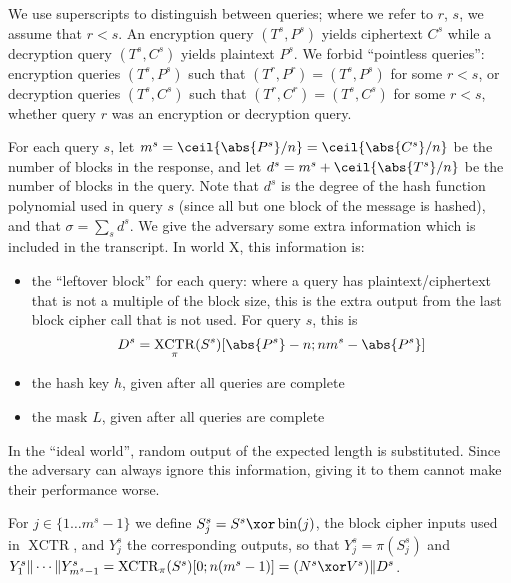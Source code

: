 \documentclass[letterpaper,11pt]{article}
\newcommand*{\Concat}{\Vert}
\DeclareMathOperator{\fromint}{bin}
\DeclareMathOperator{\XCTR}{XCTR}
\begin{document}
We use superscripts to distinguish between queries;
where we refer to \(r\), \(s\), we assume that \(r < s\).
An encryption query \((T^s, P^s)\) yields ciphertext \(C^s\)
while a decryption query \((T^s, C^s)\)
yields plaintext \(P^s\).
We forbid ``pointless queries'':
encryption queries \((T^s, P^s)\)
such that \((T^r, P^r) = (T^s, P^s)\) for some \(r < s\), 
or decryption queries \((T^s, C^s)\)
such that \((T^r, C^r) = (T^s, C^s)\) for some \(r < s\),
whether query \(r\) was an encryption or decryption query.

For each query \(s\), 
let \(m^s = \ceil{\abs{P^s}/n} = \ceil{\abs{C^s}/n}\)
be the number of blocks in the response,
and let \(d^s = m^s + \ceil{\abs{T^s}/n}\)
be the number of blocks in the query.
Note that \(d^s\) is the degree of the hash
function polynomial used in query \(s\)
(since all but one block of the message is hashed),
and that \(\sigma = \sum_s d^s\).
We give the adversary some extra information
which is included in the transcript.
In world X, this information is:
\begin{itemize}
    \item the ``leftover block'' for each query:
    where a query has plaintext/ciphertext
    that is not a multiple of the block size,
    this is the extra output from the last
    block cipher call that is not used.
    For query \(s\), this is 
    \begin{displaymath}
        D^s = \XCTR_\pi(S^s)[\abs{P^s} - n; nm^s-\abs{P^s}]
    \end{displaymath}
    \item the hash key \(h\), given after all queries are complete
    \item the mask \(L\), given after all queries are complete
\end{itemize}
In the ``ideal world'', random output of the expected
length is substituted. Since the adversary can always ignore
this information, giving it to them cannot make their performance worse.

For \(j \in \{1 \ldots m^s-1\}\) we define \(S_j^s = S^s \xor \fromint(j)\),
the block cipher inputs used in \(\XCTR\), and \(Y_j^s\) the corresponding
outputs, so that \(Y_j^s = \pi(S_j^s)\) and 
\(Y_1^s \Concat \cdots \Concat Y_{m^s-1}^s = \XCTR_\pi(S^s)[0;n(m^s -1)] 
= (N^s \xor V^s) \Concat D^s\).
\end{document}
